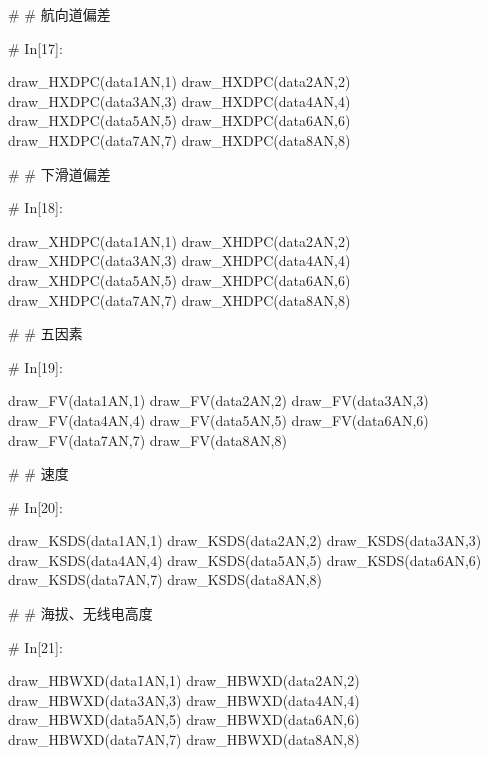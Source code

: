 \documentclass{MathorCupModeling}
\begin{document}
\begin{python}
# # 航向道偏差

# In[17]:


draw_HXDPC(data1AN,1)
draw_HXDPC(data2AN,2)
draw_HXDPC(data3AN,3)
draw_HXDPC(data4AN,4)
draw_HXDPC(data5AN,5)
draw_HXDPC(data6AN,6)
draw_HXDPC(data7AN,7)
draw_HXDPC(data8AN,8)


# # 下滑道偏差

# In[18]:


draw_XHDPC(data1AN,1)
draw_XHDPC(data2AN,2)
draw_XHDPC(data3AN,3)
draw_XHDPC(data4AN,4)
draw_XHDPC(data5AN,5)
draw_XHDPC(data6AN,6)
draw_XHDPC(data7AN,7)
draw_XHDPC(data8AN,8)


# # 五因素

# In[19]:


draw_FV(data1AN,1)
draw_FV(data2AN,2)
draw_FV(data3AN,3)
draw_FV(data4AN,4)
draw_FV(data5AN,5)
draw_FV(data6AN,6)
draw_FV(data7AN,7)
draw_FV(data8AN,8)


# # 速度

# In[20]:


draw_KSDS(data1AN,1)
draw_KSDS(data2AN,2)
draw_KSDS(data3AN,3)
draw_KSDS(data4AN,4)
draw_KSDS(data5AN,5)
draw_KSDS(data6AN,6)
draw_KSDS(data7AN,7)
draw_KSDS(data8AN,8)


# # 海拔、无线电高度

# In[21]:


draw_HBWXD(data1AN,1)
draw_HBWXD(data2AN,2)
draw_HBWXD(data3AN,3)
draw_HBWXD(data4AN,4)
draw_HBWXD(data5AN,5)
draw_HBWXD(data6AN,6)
draw_HBWXD(data7AN,7)
draw_HBWXD(data8AN,8)


\end{python}
\end{document}
